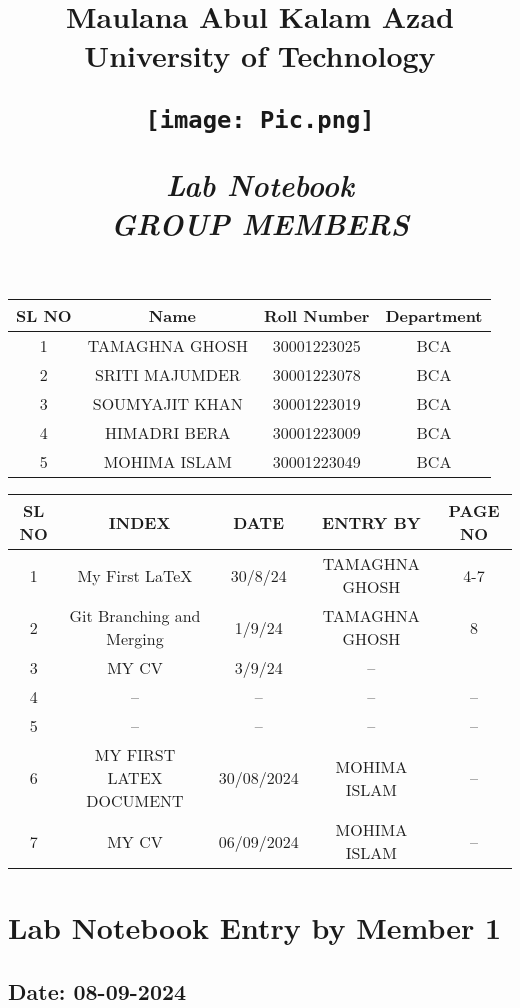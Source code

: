 \documentclass[12pt]{article}
\title{
    \vspace{0.2in}
    \Huge \textbf{Maulana Abul Kalam Azad University of Technology} \\
    \vspace{0.5in} %
    \begin{center}
        \texttt{[image: Pic.png]} %
    \end{center}
    \vspace{0.5in}
    \Huge\textbf{\textit{Lab Notebook}} \\
    \vspace{0.5in}
    \newpage
    \Large \textbf{\textit{GROUP MEMBERS}} \\
    \vspace{0.5in}
}
\date{}
\begin{document}
\maketitle

\begin{center}
    \begin{tabular}{|c| c | c | c |}
    \hline
    \textbf{SL NO}&\
    \textbf{Name} & \textbf{Roll Number} & \textbf{Department} \\
    \hline
     1 & TAMAGHNA GHOSH &30001223025 & BCA  \\
    \hline
     2& SRITI MAJUMDER & 30001223078 & BCA \\
    \hline
     3& SOUMYAJIT KHAN & 30001223019 & BCA   \\
    \hline
     4 & HIMADRI BERA & 30001223009 & BCA \\
    \hline
     5 & MOHIMA ISLAM & 30001223049 & BCA \\
    \hline
    \end{tabular}
\end{center}
\newpage
\begin{center}
    \begin{tabular}{|c|  c | c|c|c| }
    \hline
    \textbf{SL NO}&\
    \textbf{INDEX} & \textbf{DATE}&\textbf{ENTRY BY} &\textbf{PAGE NO} \\
    \hline
     1 & My First \LaTeX & 30/8/24&TAMAGHNA GHOSH & 4-7\\
    \hline
     2&Git Branching and Merging&1/9/24& TAMAGHNA GHOSH &8 \\
    \hline
     3&  MY CV & 3/9/24 & --&\\
    \hline
    4&   -- &-- &--&--\\
    5&--&--&--&--\\
    \hline
    6&MY FIRST LATEX DOCUMENT&30/08/2024&MOHIMA ISLAM&--\\
    \hline
    7&MY CV & 06/09/2024&MOHIMA ISLAM&--\\
     \end{tabular}
\end{center}

\newpage

\section{Lab Notebook Entry by Member 1}
\subsection*{Date: 08-09-2024}
\end{document}
